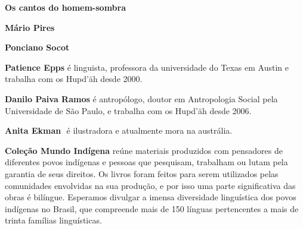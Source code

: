 \textbf{Os cantos do homem-sombra} \lipsum[1]

\textbf{Mário Pires} \lipsum[2]

\textbf{Ponciano Socot} \lipsum[2]

\textbf{Patience Epps} ​é linguista, professora da universidade do Texas em Austin e trabalha com os Hupd’äh desde 2000.

\textbf{Danilo Paiva Ramos} ​é antropólogo, doutor em Antropologia Social pela Universidade de São Paulo, e trabalha com os Hupd’äh desde 2006.

\textbf{Anita Ekman} ​ é ilustradora e atualmente mora na austrália.

\textbf{Coleção Mundo Indígena} reúne materiais produzidos com pensadores de diferentes povos indígenas e pessoas que pesquisam, trabalham ou lutam pela garantia de seus direitos. Os livros foram feitos para serem utilizados pelas comunidades envolvidas na sua produção, e por isso uma parte significativa das obras é bilíngue. Esperamos divulgar a imensa diversidade linguística dos povos indígenas no Brasil, que compreende mais de 150 línguas pertencentes a mais de trinta famílias linguísticas.



